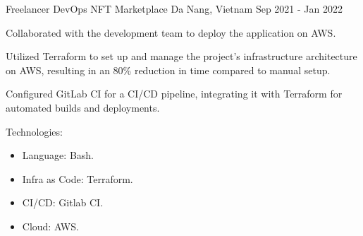 \begin{cventries}
    \cventry
    {Freelancer DevOps} %
    {NFT Marketplace} %
    {Da Nang, Vietnam} %
    {Sep 2021 - Jan 2022} %
    {
      \begin{cvitems} %
        \item {Collaborated with the development team to deploy the application on AWS.}
        \item {Utilized Terraform to set up and manage the project's infrastructure architecture on AWS, resulting in an 80\% reduction in time compared to manual setup.}
        \item {Configured GitLab CI for a CI/CD pipeline, integrating it with Terraform for automated builds and deployments.}
        \item {Technologies:
            \begin{itemize}
                \item {Language: Bash.}
                \item {Infra as Code: Terraform.}
                \item {CI/CD: Gitlab CI.}
                \item {Cloud: AWS.}
            \end{itemize}
        }
      \end{cvitems}
    }


\end{cventries}
